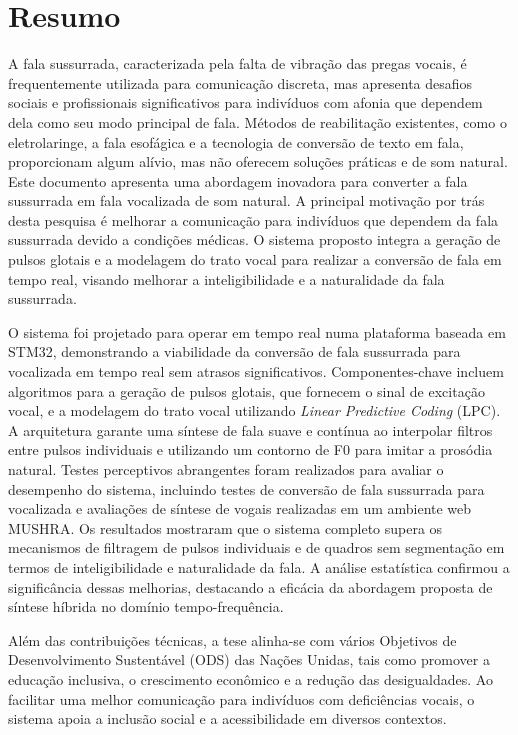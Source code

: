 \chapter*{Resumo}

A fala sussurrada, caracterizada pela falta de vibração das pregas vocais, é frequentemente utilizada para comunicação discreta, mas apresenta desafios sociais e profissionais significativos para indivíduos com afonia que dependem dela como seu modo principal de fala. Métodos de reabilitação existentes, como o eletrolaringe, a fala esofágica e a tecnologia de conversão de texto em fala, proporcionam algum alívio, mas não oferecem soluções práticas e de som natural. Este documento apresenta uma abordagem inovadora para converter a fala sussurrada em fala vocalizada de som natural. A principal motivação por trás desta pesquisa é melhorar a comunicação para indivíduos que dependem da fala sussurrada devido a condições médicas. O sistema proposto integra a geração de pulsos glotais e a modelagem do trato vocal para realizar a conversão de fala em tempo real, visando melhorar a inteligibilidade e a naturalidade da fala sussurrada.

O sistema foi projetado para operar em tempo real numa plataforma baseada em STM32, demonstrando a viabilidade da conversão de fala sussurrada para vocalizada em tempo real sem atrasos significativos. Componentes-chave incluem algoritmos para a geração de pulsos glotais, que fornecem o sinal de excitação vocal, e a modelagem do trato vocal utilizando {\it Linear Predictive Coding} (LPC). A arquitetura garante uma síntese de fala suave e contínua ao interpolar filtros entre pulsos individuais e utilizando um contorno de F0 para imitar a prosódia natural. Testes perceptivos abrangentes foram realizados para avaliar o desempenho do sistema, incluindo testes de conversão de fala sussurrada para vocalizada e avaliações de síntese de vogais realizadas em um ambiente web MUSHRA. Os resultados mostraram que o sistema completo supera os mecanismos de filtragem de pulsos individuais e de quadros sem segmentação em termos de inteligibilidade e naturalidade da fala. A análise estatística confirmou a significância dessas melhorias, destacando a eficácia da abordagem proposta de síntese híbrida no domínio tempo-frequência.

Além das contribuições técnicas, a tese alinha-se com vários Objetivos de Desenvolvimento Sustentável (ODS) das Nações Unidas, tais como promover a educação inclusiva, o crescimento econômico e a redução das desigualdades. Ao facilitar uma melhor comunicação para indivíduos com deficiências vocais, o sistema apoia a inclusão social e a acessibilidade em diversos contextos.

